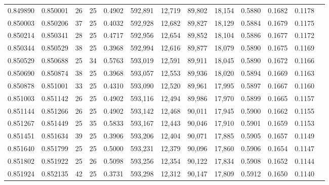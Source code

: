 \begin{tabular}{rrrrrrrrrrrrr}
0.849890 & 0.850001 &    26 &  25 &                                     0.4902 & 592,891 &  12,719 &  89,802 &  18,154 & 0.5880 & 0.1682 & 0.1178 \\
0.850003 & 0.850206 &    37 &  25 &                                     0.4032 & 592,928 &  12,682 &  89,827 &  18,129 & 0.5884 & 0.1679 & 0.1175 \\
0.850214 & 0.850341 &    28 &  25 &                                     0.4717 & 592,956 &  12,654 &  89,852 &  18,104 & 0.5886 & 0.1677 & 0.1172 \\
0.850344 & 0.850529 &    38 &  25 &                                     0.3968 & 592,994 &  12,616 &  89,877 &  18,079 & 0.5890 & 0.1675 & 0.1169 \\
0.850529 & 0.850688 &    25 &  34 &                                     0.5763 & 593,019 &  12,591 &  89,911 &  18,045 & 0.5890 & 0.1672 & 0.1166 \\
0.850690 & 0.850874 &    38 &  25 &                                     0.3968 & 593,057 &  12,553 &  89,936 &  18,020 & 0.5894 & 0.1669 & 0.1163 \\
0.850878 & 0.851001 &    33 &  25 &                                     0.4310 & 593,090 &  12,520 &  89,961 &  17,995 & 0.5897 & 0.1667 & 0.1160 \\
0.851003 & 0.851142 &    26 &  25 &                                     0.4902 & 593,116 &  12,494 &  89,986 &  17,970 & 0.5899 & 0.1665 & 0.1157 \\
0.851144 & 0.851266 &    26 &  25 &                                     0.4902 & 593,142 &  12,468 &  90,011 &  17,945 & 0.5900 & 0.1662 & 0.1155 \\
0.851267 & 0.851449 &    25 &  35 &                                     0.5833 & 593,167 &  12,443 &  90,046 &  17,910 & 0.5901 & 0.1659 & 0.1153 \\
0.851451 & 0.851634 &    39 &  25 &                                     0.3906 & 593,206 &  12,404 &  90,071 &  17,885 & 0.5905 & 0.1657 & 0.1149 \\
0.851640 & 0.851799 &    25 &  25 &                                     0.5000 & 593,231 &  12,379 &  90,096 &  17,860 & 0.5906 & 0.1654 & 0.1147 \\
0.851802 & 0.851922 &    25 &  26 &                                     0.5098 & 593,256 &  12,354 &  90,122 &  17,834 & 0.5908 & 0.1652 & 0.1144 \\
0.851924 & 0.852135 &    42 &  25 &                                     0.3731 & 593,298 &  12,312 &  90,147 &  17,809 & 0.5912 & 0.1650 & 0.1140 \\

\end{tabular}
